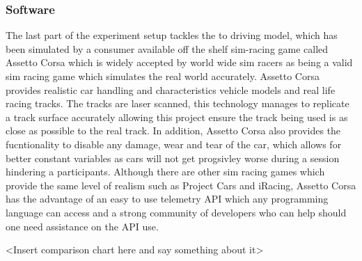 \subsubsection{Software}
The last part of the experiment setup tackles the to driving model, which has been simulated by a consumer available off the shelf sim-racing game called Assetto Corsa which is widely accepted by world wide sim racers as being a valid sim racing game which simulates the real world accurately. Assetto Corsa provides realistic car handling and characteristics vehicle models and real life racing tracks. The tracks are laser scanned, this technology manages to replicate a track surface accurately allowing this project ensure the track being used is as close as possible to the real track. In addition, Assetto Corsa also provides the fucntionality to disable any damage, wear and tear of the car, which allows for better constant variables as cars will not get progsivley worse during a session hindering a participants. Although there are other sim racing games which provide the same level of realism such as Project Cars and iRacing, Assetto Corsa has the advantage of an easy to use telemetry API which any programming language can access and a strong community of developers who can help should one need assistance on the API use.

<Insert comparison chart here and say something about it>

